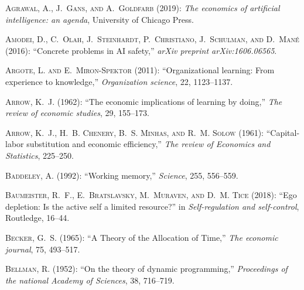 \newpage
\begin{thebibliography}{1}
\textsc{Agrawal, A., J.~Gans, and A.~Goldfarb} (2019): \emph{The economics of artificial intelligence: an agenda}, University of Chicago Press.

\textsc{Amodei, D., C.~Olah, J.~Steinhardt, P.~Christiano, J.~Schulman, and D.~Man{\'e}} (2016): \enquote{Concrete problems in AI safety,} \emph{arXiv preprint arXiv:1606.06565}.

\textsc{Argote, L. and E.~Miron-Spektor} (2011): \enquote{Organizational learning: From experience to knowledge,} \emph{Organization science}, 22, 1123--1137.

\textsc{Arrow, K.~J.} (1962): \enquote{The economic implications of learning by doing,} \emph{The review of economic studies}, 29, 155--173.

\textsc{Arrow, K.~J., H.~B. Chenery, B.~S. Minhas, and R.~M. Solow} (1961): \enquote{Capital-labor substitution and economic efficiency,} \emph{The review of Economics and Statistics}, 225--250.

\textsc{Baddeley, A.} (1992): \enquote{Working memory,} \emph{Science}, 255, 556--559.

\textsc{Baumeister, R.~F., E.~Bratslavsky, M.~Muraven, and D.~M. Tice} (2018): \enquote{Ego depletion: Is the active self a limited resource?} in \emph{Self-regulation and self-control}, Routledge, 16--44.

\textsc{Becker, G.~S.} (1965): \enquote{A Theory of the Allocation of Time,} \emph{The economic journal}, 75, 493--517.

\textsc{Bellman, R.} (1952): \enquote{On the theory of dynamic programming,} \emph{Proceedings of the national Academy of Sciences}, 38, 716--719.


\end{thebibliography}
